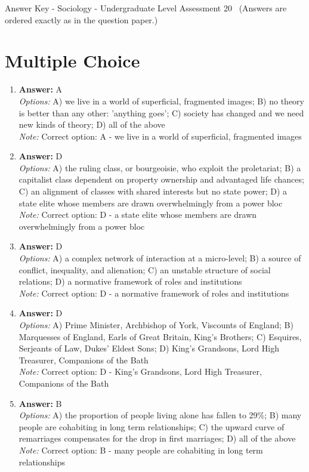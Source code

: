 \documentclass[12pt]{article}
\begin{document}
\begin{center}
Answer Key - Sociology - Undergraduate Level Assessment 20 \
\small (Answers are ordered exactly as in the question paper.)
\end{center}

\section*{Multiple Choice}
\begin{enumerate}[label=\arabic*.]
\item \textbf{Answer:} A
\\ \textit{Options:} A) we live in a world of superficial, fragmented images; B) no theory is better than any other: 'anything goes'; C) society has changed and we need new kinds of theory; D) all of the above
\\ \textit{Note:} Correct option: A - we live in a world of superficial, fragmented images
\item \textbf{Answer:} D
\\ \textit{Options:} A) the ruling class, or bourgeoisie, who exploit the proletariat; B) a capitalist class dependent on property ownership and advantaged life chances; C) an alignment of classes with shared interests but no state power; D) a state elite whose members are drawn overwhelmingly from a power bloc
\\ \textit{Note:} Correct option: D - a state elite whose members are drawn overwhelmingly from a power bloc
\item \textbf{Answer:} D
\\ \textit{Options:} A) a complex network of interaction at a micro-level; B) a source of conflict, inequality, and alienation; C) an unstable structure of social relations; D) a normative framework of roles and institutions
\\ \textit{Note:} Correct option: D - a normative framework of roles and institutions
\item \textbf{Answer:} D
\\ \textit{Options:} A) Prime Minister, Archbishop of York, Viscounts of England; B) Marquesses of England, Earls of Great Britain, King's Brothers; C) Esquires, Serjeants of Law, Dukes' Eldest Sons; D) King's Grandsons, Lord High Treasurer, Companions of the Bath
\\ \textit{Note:} Correct option: D - King's Grandsons, Lord High Treasurer, Companions of the Bath
\item \textbf{Answer:} B
\\ \textit{Options:} A) the proportion of people living alone has fallen to 29\%; B) many people are cohabiting in long term relationships; C) the upward curve of remarriages compensates for the drop in first marriages; D) all of the above
\\ \textit{Note:} Correct option: B - many people are cohabiting in long term relationships
\end{enumerate}
\end{document}
